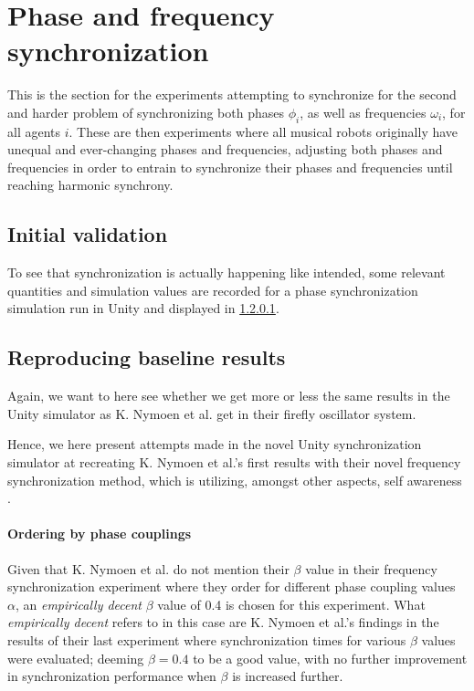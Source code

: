 


\section{Phase and frequency synchronization}
This is the section for the experiments attempting to synchronize for the second and harder problem of synchronizing both phases $\phi_i$, as well as frequencies $\omega_i$, for all agents $i$. These are then experiments where all musical robots originally have unequal and ever-changing phases  and frequencies, adjusting both phases and frequencies in order to entrain to synchronize their phases and frequencies until reaching harmonic synchrony.

	\subsection{Initial validation}
	
	To see that synchronization is actually happening like intended, some relevant quantities and simulation values are recorded for a phase synchronization simulation run in Unity and displayed in \ref{}.
	
	

	\subsection{Reproducing baseline results}
	Again, we want to here see whether we get more or less the same results in the Unity simulator as K. Nymoen et al. get in their firefly oscillator system.
	
	Hence, we here present attempts made in the novel Unity synchronization simulator at recreating K. Nymoen et al.'s first results with their novel frequency synchronization method, which is utilizing, amongst other aspects, self awareness \cite{nymoen_synch}.
	
		\paragraph{Ordering by phase couplings}
		
		Given that K. Nymoen et al. do not mention their $\beta$ value in their frequency synchronization experiment where they order for different phase coupling values $\alpha$, an \textit{empirically decent} $\beta$ value of 0.4 is chosen for this experiment. What \textit{empirically decent} refers to in this case are K. Nymoen et al.'s findings in the results of their last experiment \cite{nymoen_synch} where synchronization times for various $\beta$ values were evaluated; deeming $\beta=0.4$ to be a good value, with no further improvement in synchronization performance when $\beta$ is increased further.
		
